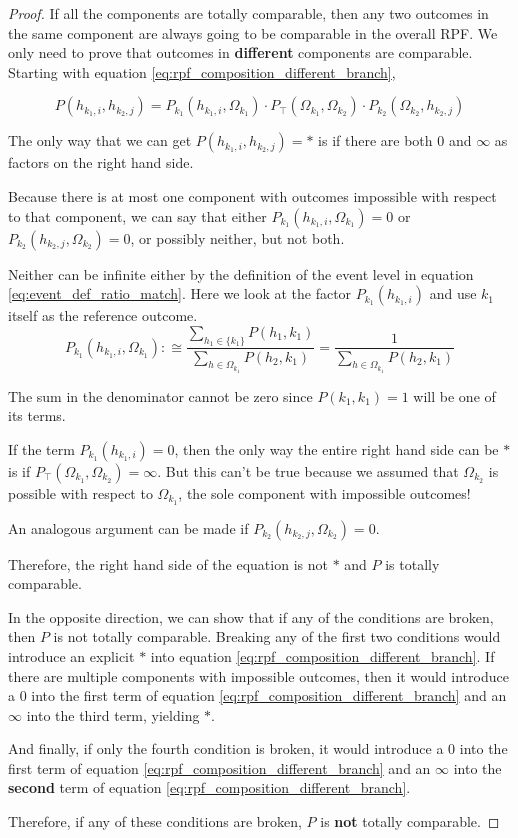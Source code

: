 \documentclass[twoside]{article}
\theoremstyle{plain}%
\theoremstyle{definition}
\theoremstyle{remark}
\begin{document}
\begin{proof}
If all the components are totally comparable, then any two outcomes in the same component are always going to be comparable in the overall RPF. We only need to prove that outcomes in \textbf{different} components are comparable. Starting with equation \ref{eq:rpf_composition_different_branch},

\begin{equation}
P(h_{k_1, i}, h_{k_2, j}) = P_{k_1}(h_{k_1, i}, \Omega_{k_1}) \cdot  P_{\top}(\Omega_{k_1}, \Omega_{k_2}) \cdot P_{k_2}(\Omega_{k_2}, h_{k_2, j})
\end{equation}

The only way that we can get \(P(h_{k_1, i}, h_{k_2, j}) = \ast\) is if there are both \(0\) and \(\infty\) as factors on the right hand side.

Because there is at most one component with outcomes impossible with respect to that component, we can say that either \(P_{k_1}(h_{k_1, i}, \Omega_{k_1}) = 0\) or \(P_{k_2}(h_{k_2, j}, \Omega_{k_2}) = 0\), or possibly neither, but not both.

Neither can be infinite either by the definition of the event level in equation \ref{eq:event_def_ratio_match}. Here we look at the factor \(P_{k_1}(h_{k_1, i})\) and use \(k_1\) itself as the reference outcome.
\[
P_{k_1}(h_{k_1, i}, \Omega_{k_1}) :\cong \frac{\sum_{h_1 \in \{k_1\}} P(h_1, k_1)}{\sum_{h \in \Omega_{k_1}} P(h_2, k_1)} = \frac{1}{\sum_{h \in \Omega_{k_1}} P(h_2, k_1)}
\]

The sum in the denominator cannot be zero since \(P(k_1, k_1) = 1\) will be one of its terms.

If the term \(P_{k_1}(h_{k_1, i}) = 0\), then the only way the entire right hand side can be \(\ast\) is if \(P_{\top}(\Omega_{k_1}, \Omega_{k_2}) = \infty\). But this can't be true because we assumed that \(\Omega_{k_2}\) is possible with respect to \(\Omega_{k_1}\), the sole component with impossible outcomes!

An analogous argument can be made if \(P_{k_2}(h_{k_2, j}, \Omega_{k_2}) = 0\).

Therefore, the right hand side of the equation is not \(\ast\) and \(P\) is totally comparable.

In the opposite direction, we can show that if any of the conditions are broken, then \(P\) is not totally comparable. Breaking any of the first two conditions would introduce an explicit \(\ast\) into equation \ref{eq:rpf_composition_different_branch}. If there are multiple components with impossible outcomes, then it would introduce a \(0\) into the first term of equation \ref{eq:rpf_composition_different_branch} and an \(\infty\) into the third term, yielding \(\ast\).

And finally, if only the fourth condition is broken, it would introduce a 0 into the first term of equation \ref{eq:rpf_composition_different_branch} and an \(\infty\) into the \textbf{second} term of equation \ref{eq:rpf_composition_different_branch}.

Therefore, if any of these conditions are broken, \(P\) is \textbf{not} totally comparable.
\end{proof}
\end{document}
